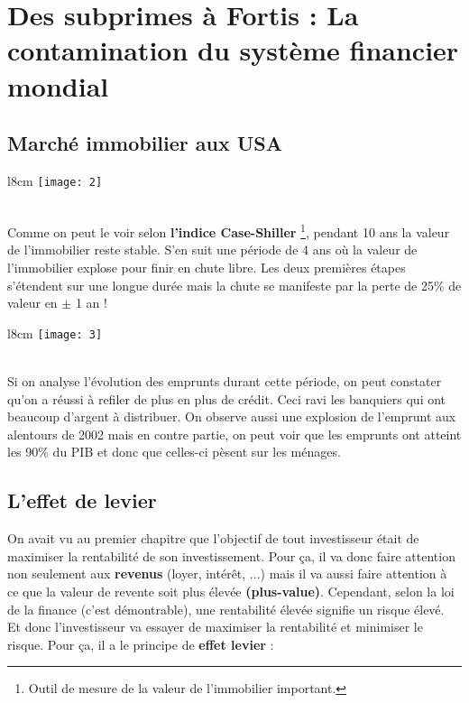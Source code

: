 
\chapter{Des subprimes à Fortis : La contamination du système financier mondial}
\section{Marché immobilier aux USA}
\begin{wrapfigure}[9]{l}{8cm}
	\texttt{[image: 2]}
\end{wrapfigure}
\ \\ Comme on peut le voir selon \textbf{l'indice Case-Shiller} \footnote{Outil de mesure de la valeur de l'immobilier important.}, pendant 10 ans la valeur de l'immobilier reste stable. S'en suit une période de 4 ans où la valeur de l'immobilier explose pour finir en chute libre. Les deux premières étapes s'étendent sur une longue durée mais la chute se manifeste par la perte de 25\% de valeur en $\pm$ 1 an !

\begin{wrapfigure}[10]{l}{8cm}
	\texttt{[image: 3]}
\end{wrapfigure}
\ \\ Si on analyse l'évolution des emprunts durant cette période, on peut constater qu'on a réussi à refiler de plus en plus de crédit. Ceci ravi les banquiers qui ont beaucoup d'argent à distribuer. On observe aussi une explosion de l'emprunt aux alentours de 2002 mais en contre partie, on peut voir que les emprunts ont atteint les 90\% du PIB et donc que celles-ci pèsent sur les ménages. 

\section{L'effet de levier}
On avait vu au premier chapitre que l'objectif de tout investisseur était de maximiser la rentabilité de son investissement. Pour ça, il va donc faire attention non seulement aux \textbf{revenus} (loyer, intérêt, ...) mais il va aussi faire attention à ce que la valeur de revente soit plus élevée \textbf{(plus-value)}. Cependant, selon la loi de la finance (c'est démontrable), une rentabilité élevée signifie un risque élevé. Et donc l'investisseur va essayer de maximiser la rentabilité et minimiser le risque. Pour ça, il a le principe de \textbf{effet levier} :

